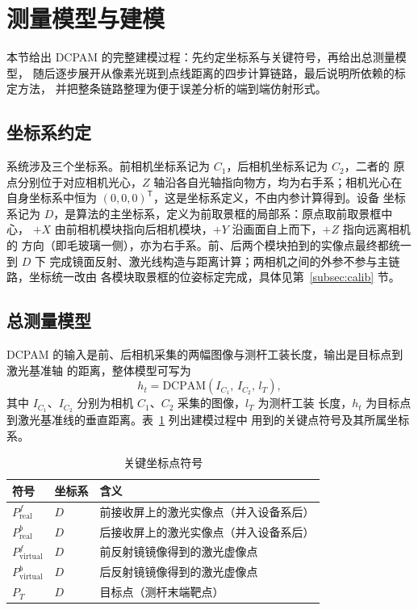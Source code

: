 \section{测量模型与建模}
\label{sec:model}

本节给出 DCPAM 的完整建模过程：先约定坐标系与关键符号，再给出总测量模型，
随后逐步展开从像素光斑到点线距离的四步计算链路，最后说明所依赖的标定方法，
并把整条链路整理为便于误差分析的端到端仿射形式。

\subsection{坐标系约定}

系统涉及三个坐标系。前相机坐标系记为 $C_1$，后相机坐标系记为 $C_2$，二者的
原点分别位于对应相机光心，$Z$ 轴沿各自光轴指向物方，均为右手系；相机光心在
自身坐标系中恒为 $(0,0,0)^\mathsf{T}$，这是坐标系定义，不由内参计算得到。设备
坐标系记为 $D$，是算法的主坐标系，定义为前取景框的局部系：原点取前取景框中心，
$+X$ 由前相机模块指向后相机模块，$+Y$ 沿画面自上而下，$+Z$ 指向远离相机的
方向（即毛玻璃一侧），亦为右手系。前、后两个模块拍到的实像点最终都统一到 $D$ 下
完成镜面反射、激光线构造与距离计算；两相机之间的外参不参与主链路，坐标统一改由
各模块取景框的位姿标定完成，具体见第~\ref{subsec:calib} 节。

\subsection{总测量模型}

DCPAM 的输入是前、后相机采集的两幅图像与测杆工装长度，输出是目标点到激光基准轴
的距离，整体模型可写为
\begin{equation}
\label{eq:dcpam}
h_t = \mathrm{DCPAM}(I_{C_1},\, I_{C_2},\, l_T),
\end{equation}
其中 $I_{C_1}$、$I_{C_2}$ 分别为相机 $C_1$、$C_2$ 采集的图像，$l_T$ 为测杆工装
长度，$h_t$ 为目标点到激光基准线的垂直距离。表~\ref{tab:symbols} 列出建模过程中
用到的关键点符号及其所属坐标系。

\begin{table}[t]
\centering
\caption{关键坐标点符号}
\label{tab:symbols}
\begin{tabular}{@{}llp{3.6cm}@{}}
\toprule
符号 & 坐标系 & 含义 \\
\midrule
$P^f_{\mathrm{real}}$      & $D$   & 前接收屏上的激光实像点（并入设备系后） \\
$P^b_{\mathrm{real}}$      & $D$   & 后接收屏上的激光实像点（并入设备系后） \\
$P^f_{\mathrm{virtual}}$   & $D$   & 前反射镜镜像得到的激光虚像点 \\
$P^b_{\mathrm{virtual}}$   & $D$   & 后反射镜镜像得到的激光虚像点 \\
$P_T$                      & $D$   & 目标点（测杆末端靶点） \\
\bottomrule
\end{tabular}
\end{table}

